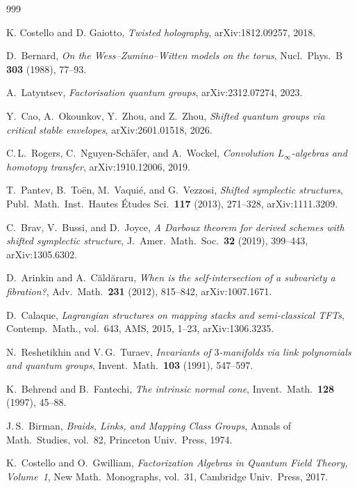 \documentclass[11pt]{memoir}
\begin{document}
\begin{thebibliography}{999}

K. Costello and D. Gaiotto, \emph{Twisted holography}, arXiv:1812.09257, 2018.

D.~Bernard, \emph{On the Wess--Zumino--Witten models on the torus}, Nucl.\ Phys.\ B \textbf{303} (1988), 77--93.

A.~Latyntsev, \emph{Factorisation quantum groups}, arXiv:2312.07274, 2023.

Y.~Cao, A.~Okounkov, Y.~Zhou, and Z.~Zhou, \emph{Shifted quantum groups via critical stable envelopes}, arXiv:2601.01518, 2026.

C.\,L.~Rogers, C.~Nguyen-Sch\"afer, and A.~Wockel, \emph{Convolution $L_\infty$-algebras and homotopy transfer}, arXiv:1910.12006, 2019.

T.~Pantev, B.~To\"en, M.~Vaqui\'e, and G.~Vezzosi, \emph{Shifted symplectic structures}, Publ.\ Math.\ Inst.\ Hautes \'Etudes Sci.\ \textbf{117} (2013), 271--328, arXiv:1111.3209.

C.~Brav, V.~Bussi, and D.~Joyce, \emph{A Darboux theorem for derived schemes with shifted symplectic structure}, J.\ Amer.\ Math.\ Soc.\ \textbf{32} (2019), 399--443, arXiv:1305.6302.

D.~Arinkin and A.~C\u{a}ld\u{a}raru, \emph{When is the self-intersection of a subvariety a fibration?}, Adv.\ Math.\ \textbf{231} (2012), 815--842, arXiv:1007.1671.

D.~Calaque, \emph{Lagrangian structures on mapping stacks and semi-classical TFTs}, Contemp.\ Math., vol.~643, AMS, 2015, 1--23, arXiv:1306.3235.

N.~Reshetikhin and V.\,G.~Turaev, \emph{Invariants of $3$-manifolds via link polynomials and quantum groups}, Invent.\ Math.\ \textbf{103} (1991), 547--597.

K.~Behrend and B.~Fantechi, \emph{The intrinsic normal cone}, Invent.\ Math.\ \textbf{128} (1997), 45--88.

J.\,S.~Birman, \emph{Braids, Links, and Mapping Class Groups}, Annals of Math.\ Studies, vol.~82, Princeton Univ.\ Press, 1974.

K.~Costello and O.~Gwilliam, \emph{Factorization Algebras in Quantum Field Theory, Volume~1}, New Math.\ Monographs, vol.~31, Cambridge Univ.\ Press, 2017.


\end{thebibliography}
\end{document}

